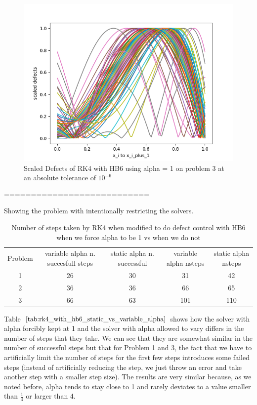 \documentclass{article}
\begin{document}
\begin{figure}[H]
\centering
\includegraphics[width=0.7\linewidth]{./figures/static_alpha_rk4_with_hb6_p3_scaled_defects}
\caption{Scaled Defects of RK4 with HB6 using alpha = 1 on problem 3 at an absolute tolerance of $10^{-6}$}
\label{fig:static_alpha_rk4_with_hb6_p3_scaled_defects}
\end{figure}
===========================

Showing the problem with intentionally restricting the solvers.
\begin{table}[h]
\caption {Number of steps taken by RK4 when modified to do defect control with HB6 when we force alpha to be 1 vs when we do not} \label{tab:rk4_with_hb6_static_vs_variable_alpha}
\begin{center}
\begin{tabular}{ c c c c c } 
Problem & variable alpha n. succesfull steps & static alpha n. successful & variable alpha nsteps & static alpha nsteps \\ 
1       & 26                      &        30               & 31         & 42\\ 
2       & 36                      &        36               & 66         & 65\\
3       & 66                      &        63               & 101        & 110\\
\end{tabular}
\end{center}
\end{table}

Table $\ref{tab:rk4_with_hb6_static_vs_variable_alpha}$ shows how the solver with alpha forcibly kept at 1 and the solver with alpha allowed to vary differs in the number of steps that they take. We can see that they are somewhat similar in the number of successful steps but that for Problem 1 and 3, the fact that we have to artificially limit the number of steps for the first few steps introduces some failed steps (instead of artificially reducing the step, we just throw an error and take another step with a smaller step size). The results are very similar because, as we noted before, alpha tends to stay close to 1 and rarely deviates to a value smaller than $\frac{1}{4}$ or larger than 4.
\end{document}
